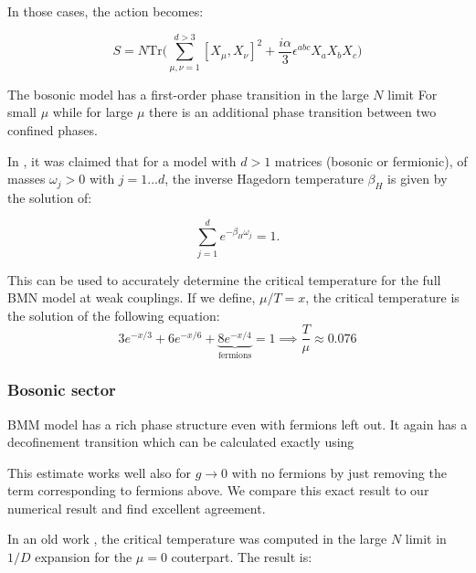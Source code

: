 \documentclass[11pt]{article}
\begin{document}
In those cases, the action becomes:

\begin{equation}
	S = N \mbox{Tr} \Bigg( \sum_{\mu, \nu = 1}^{d > 3} [X_\mu, X_\nu]^2  + \frac{i \alpha}{3} \epsilon^{abc} X_a X_b X_c \Bigg) 
\end{equation}

The bosonic model has a first-order phase transition in the large $N$ limit
For small $\mu$ while for large $\mu$ there is an additional phase transition 
between two confined phases. 


In \cite{Furuuchi:2003sy}, it was claimed that for a model with $d > 1$ 
matrices (bosonic or fermionic), of masses $\omega_{j} > 0$ with $j =
1 . . . d$, the inverse Hagedorn temperature $\beta_{H}$ is given by the solution of:

\begin{equation}
\sum_{j=1}^{d} e^{-\beta_{H} \omega_{j}} = 1. 
\end{equation}


This can be used to accurately determine the critical temperature for the full BMN model at weak couplings. If we define, $\mu/T = x$, the critical temperature is the solution of the following equation:
\begin{equation}
	3e^{-x/3} + 6e^{-x/6} + \underbrace{8e^{-x/4}}_{\text{fermions}}= 1 \implies \frac{T}{\mu} \approx 0.076
\end{equation}


\subsubsection{Bosonic sector}


BMM model has a rich phase structure even with fermions left out. 
It again has a decofinement transition which can be calculated exactly using 


 
This estimate works well also for $ g \to 0$ with no fermions by just removing the term corresponding to fermions above. We compare this exact result to our numerical result and find excellent agreement. 



In an old work \cite{Mandal:2009vz}, the critical temperature was computed in the large $N$ limit in $1/D$ expansion for the $\mu=0$ couterpart. The result is:
\end{document}
